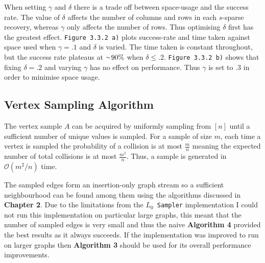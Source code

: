 \documentclass[11pt,twoside,a4paper]{report}
\begin{document}
\par When setting $\gamma$ and $\delta$ there is a trade off between space-usage and the success rate. The value of $\delta$ affects the number of columns and rows in each $s$-sparse recovery, whereas $\gamma$ only affects the number of rows. Thus optimising $\delta$ first has the greatest effect. \texttt{Figure 3.3.2 a)} plots success-rate and time taken against space used when $\gamma=.1$ and $\delta$ is varied. The time taken is constant throughout, but the success rate plateaus at $\smallsim\!90\%$ when $\delta\leq.2$. \texttt{Figure 3.3.2 b)} shows that fixing $\delta=.2$ and varying $\gamma$ has no effect on performance. Thus $\gamma$ is set to .3 in order to minimise space usage.

\subsection{Vertex Sampling Algorithm} %

\par The vertex sample $A$ can be acquired by uniformly sampling from $[n]$ until a sufficient number of unique values is sampled. For a sample of size $m$, each time a vertex is sampled the probability of a collision is at most $\frac{m}n$ meaning the expected number of total collisions is at most $\frac{m^2}{n}$. Thus, a sample is generated in $\mathcal{O}(m^2/n)$ time.

\par The sampled edges form an insertion-only graph stream so a sufficient neighbourhood can be found among them using the algorithms discussed in \textbf{Chapter 2}. Due to the limitations from the \texttt{$L_0$ Sampler} implementation I could not run this implementation on particular large graphs, this meant that the number of sampled edges is very small and thus the naive \textbf{Algorithm 4} provided the best results as it always succeeds. If the implementation was improved to run on larger graphs then \textbf{Algorithm 3} should be used for its overall performance improvements.
\end{document}
